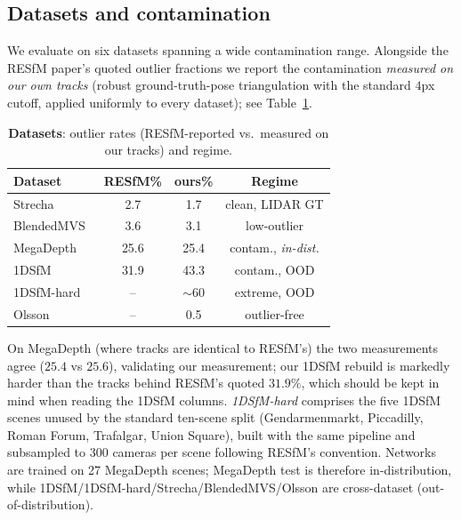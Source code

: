 \documentclass[10pt,twocolumn,letterpaper]{article}
\begin{document}
\subsection{Datasets and contamination}
We evaluate on six datasets spanning a wide contamination range. Alongside the RESfM
paper's quoted outlier fractions we report the contamination \emph{measured on our own
tracks} (robust ground-truth-pose triangulation with the standard $4$px cutoff, applied
uniformly to every dataset); see Table~\ref{tab:datasets}.
\begin{table}[t]\centering\footnotesize
\caption{\textbf{Datasets}: outlier rates (RESfM-reported vs.\ measured on our tracks) and regime.}
\label{tab:datasets}
\setlength{\tabcolsep}{1.2pt}%
\begin{tabular}{lccc}
\toprule
Dataset & RESfM\% & ours\% & Regime\\
\midrule
Strecha~\cite{strecha} & 2.7 & 1.7 & clean, LIDAR GT\\
BlendedMVS~\cite{blendedmvs} & 3.6 & 3.1 & low-outlier\\
MegaDepth~\cite{megadepth} & 25.6 & 25.4 & contam., \emph{in-dist.}\\
1DSfM~\cite{onedsfm} & 31.9 & 43.3 & contam., OOD\\
1DSfM-hard & -- & $\sim$60 & extreme, OOD\\
Olsson~\cite{olsson} & -- & 0.5 & outlier-free\\
\bottomrule
\end{tabular}
\end{table}
On MegaDepth (where tracks are identical to RESfM's) the two measurements agree
($25.4$ vs $25.6$), validating our measurement; our 1DSfM rebuild is markedly harder than
the tracks behind RESfM's quoted $31.9\%$, which should be kept in mind when reading the
1DSfM columns. \emph{1DSfM-hard} comprises the five 1DSfM scenes unused by the standard
ten-scene split (Gendarmenmarkt, Piccadilly, Roman Forum, Trafalgar, Union Square), built
with the same pipeline and subsampled to $300$ cameras per scene following RESfM's
convention. Networks are trained on 27 MegaDepth scenes; MegaDepth test is therefore
in-distribution, while 1DSfM/1DSfM-hard/Strecha/BlendedMVS/Olsson are cross-dataset
(out-of-distribution).
\end{document}
